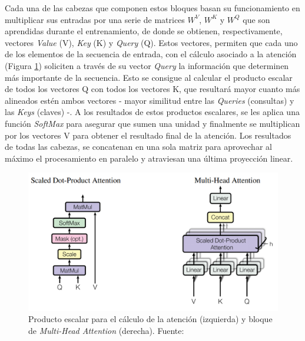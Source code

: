 \documentclass[a4paper, 11pt]{article}
\begin{document}
Cada una de las cabezas que componen estos bloques basan su funcionamiento en multiplicar sus entradas por una serie de matrices $W^V$, $W^K$ y $W^Q$ que son aprendidas durante el entrenamiento, de donde se obtienen, respectivamente, vectores \textit{Value} (V), \textit{Key} (K) y \textit{Query} (Q). Estos vectores, permiten que cada uno de los elementos de la secuencia de entrada, con el cálculo asociado a la atención (Figura \ref{fig:multi-head-attention}) soliciten a través de su vector \textit{Query} la información que determinen más importante de la secuencia. Esto se consigue al calcular el producto escalar de todos los vectores Q con todos los vectores K, que resultará mayor cuanto más alineados estén ambos vectores - mayor similitud entre las \textit{Queries} (consultas) y las \textit{Keys} (claves) -. A los resultados de estos productos escalares, se les aplica una función \textit{SoftMax} para asegurar que sumen una unidad y finalmente se multiplican por los vectores V para obtener el resultado final de la atención. Los resultados de todas las cabezas, se concatenan en una sola matriz para aprovechar al máximo el procesamiento en paralelo y atraviesan una última proyección linear.
\begin{figure}[H]
\centering
\includegraphics[width=0.65\linewidth]{imagenes/multi-head-attention.png} 
\captionsetup{width=.8\linewidth}
\caption{Producto escalar para el cálculo de la atención (izquierda) y bloque de \textit{Multi-Head Attention} (derecha). Fuente: \cite{NIPS2017_3f5ee243}}
\label{fig:multi-head-attention}
\end{figure}

\end{document}
